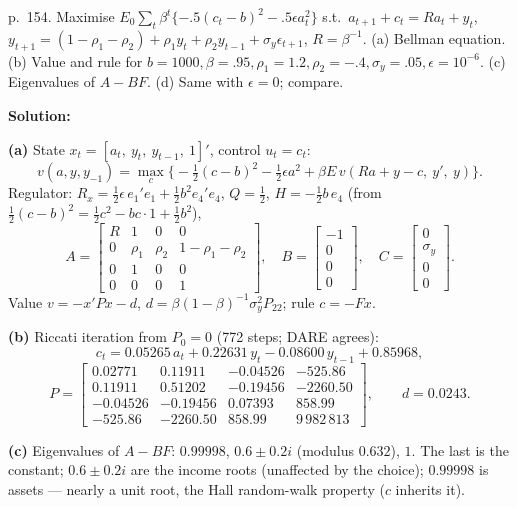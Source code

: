 \documentclass[12pt, letterpaper]{article}
\begin{document}
\begin{tcolorbox}[oddbox,title={Exercise 5.13 \quad Permanent income model}]
\begin{tcolorbox}[questionbox]
p.~154. Maximise $E_0\sum_t\beta^t\{-.5(c_t-b)^2-.5\epsilon a_t^2\}$ s.t.\ $a_{t+1}+c_t=Ra_t+y_t$,
$y_{t+1}=(1-\rho_1-\rho_2)+\rho_1y_t+\rho_2y_{t-1}+\sigma_y\epsilon_{t+1}$, $R=\beta^{-1}$.
(a) Bellman equation. (b) Value and rule for $b=1000,\beta=.95,\rho_1=1.2,\rho_2=-.4,\sigma_y=.05,
\epsilon=10^{-6}$. (c) Eigenvalues of $A-BF$. (d) Same with $\epsilon=0$; compare.
\end{tcolorbox}

\textbf{Solution:}

\textbf{(a)} State $x_t=[a_t,\ y_t,\ y_{t-1},\ 1]'$, control $u_t=c_t$:
\[
v(a,y,y_{-1})=\max_c\big\{-\tfrac12(c-b)^2-\tfrac12\epsilon a^2+\beta E\,v(Ra+y-c,\ y',\ y)\big\}.
\]
Regulator: $R_x=\tfrac12\epsilon\,e_1'e_1+\tfrac12b^2e_4'e_4$, $Q=\tfrac12$, $H=-\tfrac12b\,e_4$ (from
$\tfrac12(c-b)^2=\tfrac12c^2-bc\cdot1+\tfrac12b^2$),
\[
A=\begin{bmatrix}R&1&0&0\\0&\rho_1&\rho_2&1-\rho_1-\rho_2\\0&1&0&0\\0&0&0&1\end{bmatrix},\quad
B=\begin{bmatrix}-1\\0\\0\\0\end{bmatrix},\quad C=\begin{bmatrix}0\\\sigma_y\\0\\0\end{bmatrix}.
\]
Value $v=-x'Px-d$, $d=\beta(1-\beta)^{-1}\sigma_y^2P_{22}$; rule $c=-Fx$.

\textbf{(b)} Riccati iteration from $P_0=0$ (772 steps; DARE agrees):
\[
c_t=0.05265\,a_t+0.22631\,y_t-0.08600\,y_{t-1}+0.85968,
\]
\[
P=\begin{bmatrix}0.02771&0.11911&-0.04526&-525.86\\0.11911&0.51202&-0.19456&-2260.50\\
-0.04526&-0.19456&0.07393&858.99\\-525.86&-2260.50&858.99&9\,982\,813\end{bmatrix},\qquad d=0.0243 .
\]

\textbf{(c)} Eigenvalues of $A-BF$: $0.99998$, $0.6\pm0.2i$ (modulus $0.632$), $1$. The last is the
constant; $0.6\pm0.2i$ are the income roots (unaffected by the choice); $0.99998$ is assets ---
nearly a unit root, the Hall random-walk property ($c$ inherits it).


\end{tcolorbox}
\end{document}
